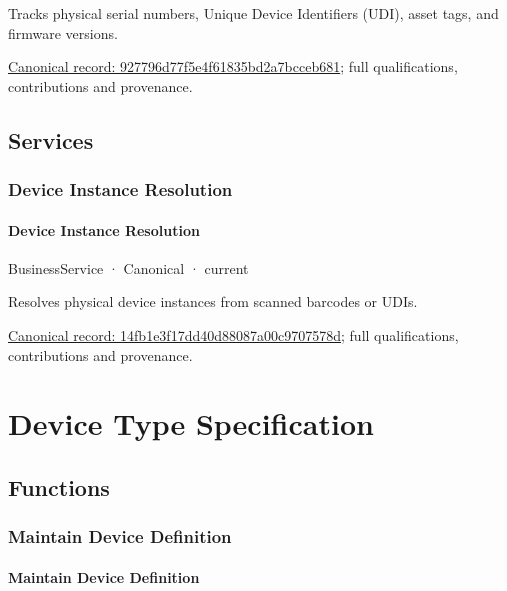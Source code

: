 Tracks physical serial numbers, Unique Device Identifiers (UDI), asset tags, and firmware versions.


{\footnotesize \href{../../../../continuum/business/business-function/927796d77f5e4f61835bd2a7bcceb681.md}{Canonical record: 927796d77f5e4f61835bd2a7bcceb681}; full qualifications, contributions and provenance.}\par
\subsection{Services}

\subsubsection{Device Instance Resolution}

\paragraph{Device Instance Resolution}

\label{element:14fb1e3f17dd40d88087a00c9707578d}
{\small BusinessService · Canonical · current}\par

Resolves physical device instances from scanned barcodes or UDIs.


{\footnotesize \href{../../../../continuum/business/business-service/14fb1e3f17dd40d88087a00c9707578d.md}{Canonical record: 14fb1e3f17dd40d88087a00c9707578d}; full qualifications, contributions and provenance.}\par
\section{Device Type Specification}

\subsection{Functions}

\subsubsection{Maintain Device Definition}

\paragraph{Maintain Device Definition}

